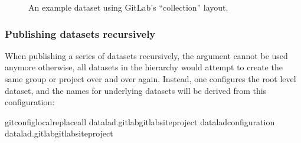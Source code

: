\begin{figure}[tbp]
\centering
\capstart

\noindent{}
\caption{An example dataset using GitLab’s “collection” layout.}\label{\detokenize{basics/101-139-hostingservices:id14}}\end{figure}


\subsubsection{Publishing datasets recursively}
\label{\detokenize{basics/101-139-hostingservices:publishing-datasets-recursively}}
\sphinxAtStartPar
When publishing a series of datasets recursively, the  argument cannot be used anymore \sphinxhyphen{} otherwise, all datasets in the hierarchy would attempt to create the same group or project over and over again.
Instead, one configures the root level dataset, and the names for underlying datasets will be derived from this configuration:

\ignorespaces 
\def\sphinxLiteralBlockLabel{\label{\detokenize{basics/101-139-hostingservices:index-2}}}
\begin{sphinxVerbatim}[commandchars=\\\{\}]
gitconfig\PYGZhy{}\PYGZhy{}local\PYGZhy{}\PYGZhy{}replace\PYGZhy{}all
datalad.gitlab\PYGZhy{}\PYGZlt{}gitlab\PYGZhy{}site\PYGZgt{}\PYGZhy{}project
dataladconfiguration
datalad.gitlab\PYGZhy{}\PYGZlt{}gitlab\PYGZhy{}site\PYGZgt{}\PYGZhy{}project
\end{sphinxVerbatim}

